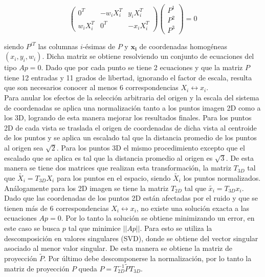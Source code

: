    \[
   \begin{pmatrix}
   0^T & -w_iX_i^T & y_iX_i^T \\
   w_iX_i^T & 0^T & -x_iX_i^T
   \end{pmatrix}
   \begin{pmatrix}
    P^1 \\
    P^2 \\
    P^3
   \end{pmatrix}
   = 0   
      \]
   
   
 siendo $P^{iT}$ las columnas $i$-ésimas de $P$ y $\mathbf{x_i}$ de coordenadas homogéneas $(x_i,y_i,w_i)$. Dicha matriz se obtiene resolviendo un conjunto de ecuaciones del tipo $Ap=0$.  Dado que por cada punto se tiene 2 ecuaciones y que la matriz $P$ tiene 12 entradas y 11 grados de libertad, ignorando el factor de escala, resulta que son necesarios conocer al menos 6 correspondencias $X_i \leftrightarrow x_i$.\\
 
Para anular los efectos de la selección arbitraria del origen y la escala del sistema de coordenadas se aplica una normalización tanto a los puntos imagen 2D como a los 3D, logrando de esta manera mejorar los resultados finales. Para los puntos 2D de cada vista se traslada el origen de coordenadas de dicha vista al centroide de los puntos y se aplica un escalado tal que la distancia promedio de los puntos al origen sea $\sqrt{2}$. Para los puntos 3D el mismo procedimiento excepto que el escalado que se aplica es tal que la distancia promedio al origen es $\sqrt{3}$. De esta manera se tiene dos matrices que realizan esta transformación, la matriz $T_{3D}$ tal que $\tilde{X_i} = T_{3D}^{}X_i$ para los puntos en el espacio, siendo $\tilde{X_i}$ los puntos normalizados. Análogamente para los 2D imagen se tiene la matriz $T_{2D}^{}$ tal que $\tilde{x_i} = T_{3D}^{}x_i$. \\
 
 Dado que las coordenadas de los puntos 2D están afectadas por el ruido y que se tienen más de 6 correspondencias $X_i \leftrightarrow x_i$, no existe una solución exacta a las ecuaciones $Ap=0$. Por lo tanto la solución se obtiene minimizando un error, en este caso se busca $p$ tal que minimice $||Ap||$. Para esto se utiliza la descomposición en valores singulares (SVD), donde se obtiene del vector singular asociado al menor valor singular. De esta manera se obtiene la matriz de proyección $\tilde{P}$. Por último debe descomponerse la normalización, por lo tanto la matriz de proyección $P$ queda $P = T_{2D}^{-1} \tilde{P} T_{3D}^{}$.
 
